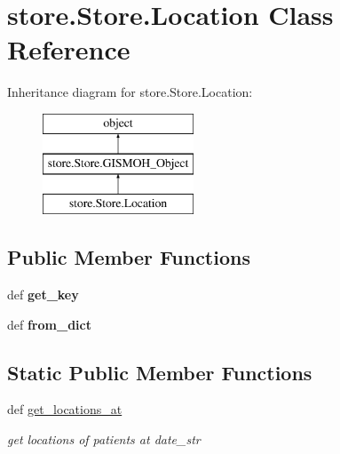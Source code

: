 \hypertarget{classstore_1_1_store_1_1_location}{\section{store.\-Store.\-Location Class Reference}
\label{classstore_1_1_store_1_1_location}
}
Inheritance diagram for store.\-Store.\-Location\-:\begin{figure}[H]
\begin{center}
\leavevmode
\includegraphics[height=3.000000cm]{classstore_1_1_store_1_1_location}
\end{center}
\end{figure}
\subsection*{Public Member Functions}
\begin{DoxyCompactItemize}
\item 
\hypertarget{classstore_1_1_store_1_1_location_a4b34b2c15a0267af06c0e262f084aa1c}{def {\bfseries get\-\_\-key}}\label{classstore_1_1_store_1_1_location_a4b34b2c15a0267af06c0e262f084aa1c}

\item 
\hypertarget{classstore_1_1_store_1_1_location_a198fee5135ac3d43ddf42e3af082f8df}{def {\bfseries from\-\_\-dict}}\label{classstore_1_1_store_1_1_location_a198fee5135ac3d43ddf42e3af082f8df}

\end{DoxyCompactItemize}
\subsection*{Static Public Member Functions}
\begin{DoxyCompactItemize}
\item 
def \hyperlink{classstore_1_1_store_1_1_location_a8f91f3015909f609043208b23811ce88}{get\-\_\-locations\-\_\-at}
\begin{DoxyCompactList}\small\item\em get locations of patients at date\-\_\-str \end{DoxyCompactList}\end{DoxyCompactItemize}
